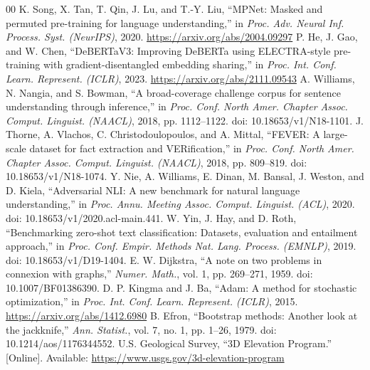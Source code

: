 \documentclass[conference]{IEEEtran}
\begin{document}
\begin{thebibliography}{00}
 K. Song, X. Tan, T. Qin, J. Lu, and T.-Y. Liu, ``MPNet: Masked and permuted pre-training for language understanding,'' in \textit{Proc. Adv. Neural Inf. Process. Syst. (NeurIPS)}, 2020. \url{https://arxiv.org/abs/2004.09297}
 P. He, J. Gao, and W. Chen, ``DeBERTaV3: Improving DeBERTa using ELECTRA-style pre-training with gradient-disentangled embedding sharing,'' in \textit{Proc. Int. Conf. Learn. Represent. (ICLR)}, 2023. \url{https://arxiv.org/abs/2111.09543}
 A. Williams, N. Nangia, and S. Bowman, ``A broad-coverage challenge corpus for sentence understanding through inference,'' in \textit{Proc. Conf. North Amer. Chapter Assoc. Comput. Linguist. (NAACL)}, 2018, pp. 1112--1122. doi: 10.18653/v1/N18-1101.
 J. Thorne, A. Vlachos, C. Christodoulopoulos, and A. Mittal, ``FEVER: A large-scale dataset for fact extraction and VERification,'' in \textit{Proc. Conf. North Amer. Chapter Assoc. Comput. Linguist. (NAACL)}, 2018, pp. 809--819. doi: 10.18653/v1/N18-1074.
 Y. Nie, A. Williams, E. Dinan, M. Bansal, J. Weston, and D. Kiela, ``Adversarial NLI: A new benchmark for natural language understanding,'' in \textit{Proc. Annu. Meeting Assoc. Comput. Linguist. (ACL)}, 2020. doi: 10.18653/v1/2020.acl-main.441.
 W. Yin, J. Hay, and D. Roth, ``Benchmarking zero-shot text classification: Datasets, evaluation and entailment approach,'' in \textit{Proc. Conf. Empir. Methods Nat. Lang. Process. (EMNLP)}, 2019. doi: 10.18653/v1/D19-1404.
 E. W. Dijkstra, ``A note on two problems in connexion with graphs,'' \textit{Numer. Math.}, vol. 1, pp. 269--271, 1959. doi: 10.1007/BF01386390.
 D. P. Kingma and J. Ba, ``Adam: A method for stochastic optimization,'' in \textit{Proc. Int. Conf. Learn. Represent. (ICLR)}, 2015. \url{https://arxiv.org/abs/1412.6980}
 B. Efron, ``Bootstrap methods: Another look at the jackknife,'' \textit{Ann. Statist.}, vol. 7, no. 1, pp. 1--26, 1979. doi: 10.1214/aos/1176344552.
 U.S. Geological Survey, ``3D Elevation Program.'' [Online]. Available: \url{https://www.usgs.gov/3d-elevation-program}
\end{thebibliography}
\end{document}
